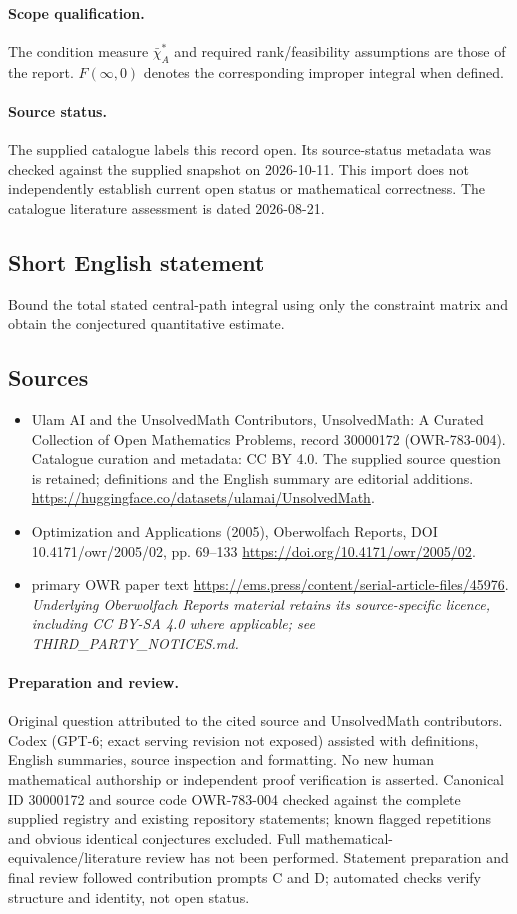 \documentclass[11pt]{article}
\begin{document}
\paragraph{Scope qualification.}
The condition measure $\bar\chi_A^*$ and required rank/feasibility assumptions are those of the report. $F(\infty,0)$ denotes the corresponding improper integral when defined.
\paragraph{Source status.}
The supplied catalogue labels this record open. Its source-status metadata was checked against the supplied snapshot on 2026-10-11. This import does not independently establish current open status or mathematical correctness. The catalogue literature assessment is dated 2026-08-21.
\subsection{Short English statement}
Bound the total stated central-path integral using only the constraint matrix and obtain the conjectured quantitative estimate.
\subsection{Sources}
\begin{itemize}
\item[S1] Ulam AI and the UnsolvedMath Contributors, UnsolvedMath: A Curated Collection of Open Mathematics Problems, record 30000172 (OWR-783-004). Catalogue curation and metadata: CC BY 4.0. The supplied source question is retained; definitions and the English summary are editorial additions.
\url{https://huggingface.co/datasets/ulamai/UnsolvedMath}.
\item[S2] Optimization and Applications (2005), Oberwolfach Reports, DOI 10.4171/owr/2005/02, pp. 69--133
\url{https://doi.org/10.4171/owr/2005/02}.
\item[S3] primary OWR paper text
\url{https://ems.press/content/serial-article-files/45976}.
\textit{Underlying Oberwolfach Reports material retains its source-specific licence, including CC BY-SA 4.0 where applicable; see THIRD\_PARTY\_NOTICES.md.}
\end{itemize}
\paragraph{Preparation and review.}
Original question attributed to the cited source and UnsolvedMath contributors. Codex (GPT-6; exact serving revision not exposed) assisted with definitions, English summaries, source inspection and formatting. No new human mathematical authorship or independent proof verification is asserted. Canonical ID 30000172 and source code OWR-783-004 checked against the complete supplied registry and existing repository statements; known flagged repetitions and obvious identical conjectures excluded. Full mathematical-equivalence/literature review has not been performed. Statement preparation and final review followed contribution prompts C and D; automated checks verify structure and identity, not open status.
\label{end:30000172}
\end{document}
